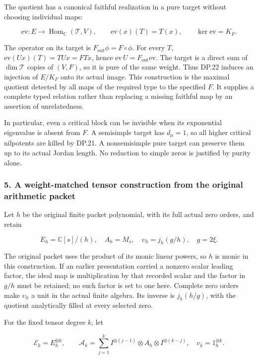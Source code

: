The quotient has a canonical faithful realization in a pure target without choosing individual maps:

\[
\mathrm{ev}:E\longrightarrow
 \operatorname{Hom}_{\mathbb C}(\mathscr T,V),
\qquad \mathrm{ev}(x)(T)=T(x),
\qquad \ker\mathrm{ev}=K_F.
\tag{DP.22}
\]

The operator on its target is \(F_{\mathrm{out}}\phi=F\circ\phi\). For every \(T\), \(\mathrm{ev}(Ux)(T)=TUx=FTx\), hence \(\mathrm{ev}\,U=F_{\mathrm{out}}\mathrm{ev}\). The target is a direct sum of \(\dim\mathscr T\) copies of \((V,F)\), so it is pure of the same weight. Thus DP.22 induces an injection of \(E/K_F\) onto its actual image. This construction is the maximal quotient detected by all maps of the required type to the specified \(F\). It supplies a complete typed relation rather than replacing a missing faithful map by an assertion of unrelatedness.

In particular, even a critical block can be invisible when its exponential eigenvalue is absent from \(F\). A semisimple target has \(d_\mu=1\), so all higher critical nilpotents are killed by DP.21. A nonsemisimple pure target can preserve them up to its actual Jordan length. No reduction to simple zeros is justified by purity alone.

\subsubsection{5. A weight-matched tensor construction from the original arithmetic packet}\label{endpoint-purity_review--a-weight-matched-tensor-construction-from-the-original-arithmetic-packet}

Let \(h\) be the original finite packet polynomial, with its full actual zero orders, and retain

\[
E_h=\mathbb C[s]/(h),\quad A_h=M_s,\quad
\upsilon_h=j_h(g/h),\quad g=2\xi.
\tag{DP.23}
\]

The original packet uses the product of its monic linear powers, so \(h\) is monic in this construction. If an earlier presentation carried a nonzero scalar leading factor, the ideal map is multiplication by that recorded scalar and the factor in \(g/h\) must be retained; no such factor is set to one here. Complete zero orders make \(\upsilon_h\) a unit in the actual finite algebra. Its inverse is \(j_h(h/g)\), with the quotient analytically filled at every selected zero.

For the fixed tensor degree \(k\), let

\[
\mathcal E_k=E_h^{\otimes k},\qquad
\mathcal A_k=\sum_{j=1}^k
 I^{\otimes(j-1)}\otimes A_h\otimes I^{\otimes(k-j)},
\quad v_k=1_h^{\otimes k}.
\tag{DP.24}
\]

